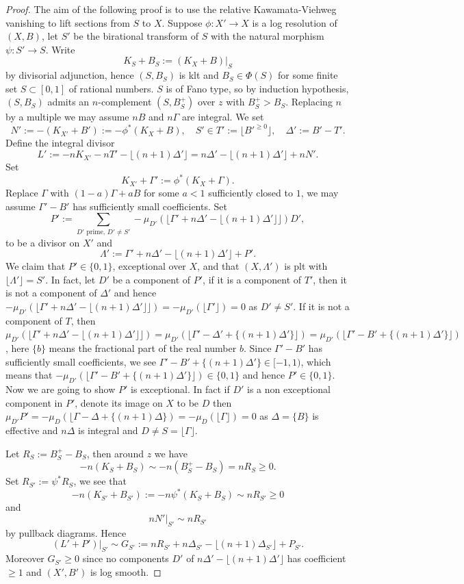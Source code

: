 \documentclass[letterpaper,reqno,12pt]{amsart}
\numberwithin{equation}{section}
\theoremstyle{plain}
\begin{document}
\begin{proof}
    The aim of the following proof is to use the relative Kawamata-Viehweg vanishing to lift sections from $S$ to $X$. Suppose $\phi:X'\to X$ is a log resolution of $(X,B)$, let $S'$ be the birational transform of $S$ with the natural morphism $\psi:S'\to S$. Write \[K_S+B_S:=(K_X+B)|_S\] by divisorial adjunction, hence $(S,B_S)$ is klt and $B_S\in \Phi(S)$ for some finite set $S\subset [0,1]$ of rational numbers. $S$ is of Fano type, so by induction hypothesis, $(S,B_S)$ admits an $n$-complement $(S,B_S^+)$ over $z$ with $B_S^+>B_S$. Replacing $n$ by a multiple we may assume $nB$ and $n\Gamma$ are integral. We set \[N':=-(K_{X'}+B'):=-\phi^*(K_X+B),\quad S'\in T':=\lfloor B'^{\geq 0}\rfloor, \quad\Delta':=B'-T'.\] Define the integral divisor \[L':=-nK_{X'}-nT'-\lfloor(n+1)\Delta'\rfloor=n\Delta'-\lfloor(n+1)\Delta'\rfloor+nN'.\] Set \[K_{X'}+\Gamma':=\phi^*(K_X+\Gamma).\] Replace $\Gamma$ with $(1-a)\Gamma+aB$ for some $a<1$ sufficiently closed to $1$, we may assume $\Gamma'-B'$ has sufficiently small coefficients. Set \[P':=\sum\limits_{D'\text{ prime, }D'\neq S'}-\mu_{D'}(\lfloor\Gamma'+n\Delta'-\lfloor(n+1)\Delta'\rfloor\rfloor) D',\] to be a divisor on $X'$ and \[\Lambda':=\Gamma'+n\Delta'-\lfloor(n+1)\Delta'\rfloor+P'.\] 
    We claim that $P'\in\{0,1\}$, exceptional over $X$, and that $(X,\Lambda')$ is plt with $\lfloor \Lambda'\rfloor=S'$. In fact, let $D'$ be a component of $P'$, if it is a component of $T'$, then it is not a component of $\Delta'$ and hence $-\mu_{D'}(\lfloor\Gamma'+n\Delta'-\lfloor(n+1)\Delta'\rfloor\rfloor)=-\mu_{D'}(\lfloor \Gamma'\rfloor)=0$ as $D'\neq S'$. If it is not a component of $T$, then $\mu_{D'}(\lfloor\Gamma'+n\Delta'-\lfloor(n+1)\Delta'\rfloor\rfloor)=\mu_{D'}(\lfloor \Gamma'-\Delta'+\{(n+1)\Delta'\}\rfloor)=\mu_{D'}(\lfloor \Gamma'-B'+\{(n+1)\Delta'\}\rfloor)$, here $\{b\}$ means the fractional part of the real number $b$. Since $\Gamma'-B'$ has sufficiently small coefficients, we see $\Gamma'-B'+\{(n+1)\Delta'\}\in[-1,1)$, which means that $-\mu_{D'}(\lfloor \Gamma'-B'+\{(n+1)\Delta'\}\rfloor)\in\{0,1\}$ and hence $P'\in\{0,1\}$. Now we are going to show $P'$ is exceptional. In fact if $D'$ is a non exceptional component in $P'$, denote its image on $X$ to be $D$ then $\mu_{D'}P'=-\mu_D(\lfloor \Gamma-\Delta+\{(n+1)\Delta\})=-\mu_D(\lfloor \Gamma\rfloor)=0$ as $\Delta=\{B\}$ is effective and $n\Delta$ is integral and $D\neq S=\lfloor \Gamma\rfloor$.

    Let $R_S:=B_S^+-B_S$, then around $z$ we have \[-n(K_S+B_S)\sim-n(B_S^+-B_S)=nR_S\geq 0.\] Set $R_{S'}:=\psi^*R_S$, we see that \[-n(K_{S'}+B_{S'}):=-n\psi^*(K_S+B_S)\sim nR_{S'}\geq 0\] and \[nN'|_{S'}\sim nR_{S'}\] by pullback diagrams. Hence \[(L'+P')|_{S'}\sim G_{S'}:=n R_{S'}+n\Delta_{S'}-\lfloor (n+1)\Delta_{S'}\rfloor+P_{S'}.\] Moreover $G_{S'}\geq 0$ since no components $D'$ of $n\Delta'-\lfloor(n+1)\Delta'\rfloor$ has coefficient $\geq 1$ and $(X',B')$ is log smooth. 
    

\end{proof}
\end{document}
